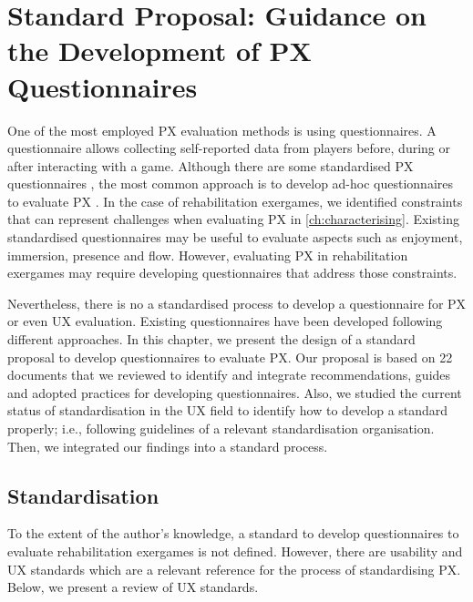 \chapter{Standard Proposal: Guidance on the Development of PX Questionnaires}
\label{ch:questionnaire}

% 
One of the most employed \ac{PX} evaluation methods is using questionnaires. A questionnaire allows collecting self-reported data from players before, during or after interacting with a game. Although there are some standardised \ac{PX} questionnaires \autocite{denisova_convergence_2016,VandenAbeele2016,Calvillo-Gamez2015,Brockmyer2009,Poels2008,DeKort2007,Vorderer2004}, the most common approach is to develop ad-hoc questionnaires to evaluate \ac{PX} \autocite{Yanez-Gomez2017}. In the case of rehabilitation exergames, we identified constraints that can represent challenges when evaluating \ac{PX} in \autoref{ch:characterising}. Existing standardised questionnaires may be useful to evaluate aspects such as enjoyment, immersion, presence and flow. However, evaluating \ac{PX} in rehabilitation exergames may require developing questionnaires that address those constraints.

Nevertheless, there is no a standardised process to develop a questionnaire for \ac{PX} or even \ac{UX} evaluation. Existing questionnaires have been developed following different approaches. In this chapter, we present the design of a standard proposal to develop questionnaires to evaluate \ac{PX}. Our proposal is based on 22 documents that we reviewed to identify and integrate recommendations, guides and adopted practices for developing questionnaires. Also, we studied the current status of standardisation in the \ac{UX} field to identify how to develop a standard properly; i.e., following guidelines of a relevant standardisation organisation. Then, we integrated our findings into a standard process.

\section{Standardisation} %
\label{sec:standardisation}
To the extent of the author's knowledge, a standard to develop questionnaires to evaluate rehabilitation exergames is not defined. However, there are usability and \ac{UX} standards which are a relevant reference for the process of standardising \ac{PX}. Below, we present a review of \ac{UX} standards.

